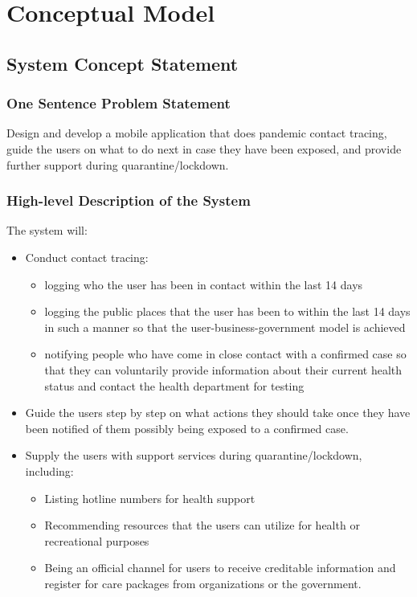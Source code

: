 \section{Conceptual Model}
  \subsection{System Concept Statement}

    \subsubsection{One Sentence Problem Statement}
      \par Design and develop a mobile application that does pandemic contact tracing, guide the users on what to do next in case they have been exposed, and provide further support during quarantine/lockdown.

    \subsubsection{High-level Description of the System}
      \par The system will:
      \begin{itemize}
        \item Conduct contact tracing:
        \begin{itemize}
          \item logging who the user has been in contact within the last 14 days
          \item logging the public places that the user has been to within the last 14 days in such a manner so that the user-business-government model is achieved
          \item notifying people who have come in close contact with a confirmed case so that they can voluntarily provide information about their current health status and contact the health department for testing
        \end{itemize}
        \item Guide the users step by step on what actions they should take once they have been notified of them possibly being exposed to a confirmed case.
        \item Supply the users with support services during quarantine/lockdown, including:
          \begin{itemize}
            \item Listing hotline numbers for health support
            \item Recommending resources that the users can utilize for health or recreational purposes
            \item Being an official channel for users to receive creditable information and register for care packages from organizations or the government.
          \end{itemize}
      \end{itemize}

